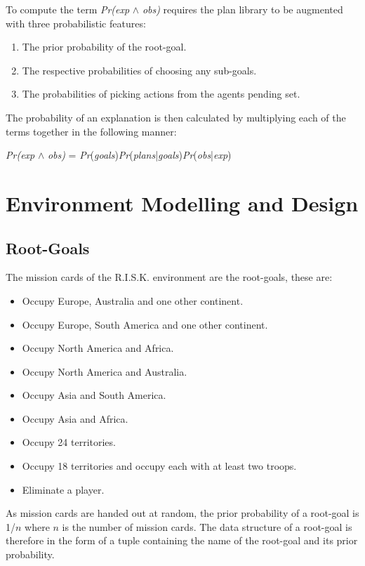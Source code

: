 \documentclass[parskip]{cs4rep}
\begin{document}
To compute the term \textit{Pr(exp} $\wedge$ \textit{obs)} requires the plan library to be augmented with three probabilistic features:\newline

\begin{enumerate}
\item
The prior probability of the root-goal.
\item
The respective probabilities of choosing any sub-goals.
\item
The probabilities of picking actions from the agents pending set.
\end{enumerate}

The probability of an explanation is then calculated by multiplying each of the terms together in the following manner: \newline

\centerline{
\textit{Pr(exp} $\wedge$ \textit{obs)} = \textit{Pr}(\textit{goals})\textit{Pr}(\textit{plans}|\textit{goals})\textit{Pr}(\textit{obs}|\textit{exp})
}

\section{Environment Modelling and Design}

\subsection{Root-Goals}

The mission cards of the R.I.S.K. environment are the root-goals, these are:

\begin{itemize}
\item
Occupy Europe, Australia and one other continent.
\item
Occupy Europe, South America and one other continent.
\item
Occupy North America and Africa.
\item
Occupy North America and Australia.
\item
Occupy Asia and South America.
\item
Occupy Asia and Africa.
\item
Occupy 24 territories.
\item
Occupy 18 territories and occupy each with at least two troops.
\item
Eliminate a player.
\end{itemize}

As mission cards are handed out at random, the prior probability of a root-goal is 1/$n$ where $n$ is the number of mission cards. The data structure of a root-goal is therefore in the form of a tuple containing the name of the root-goal and its prior probability.
\end{document}
